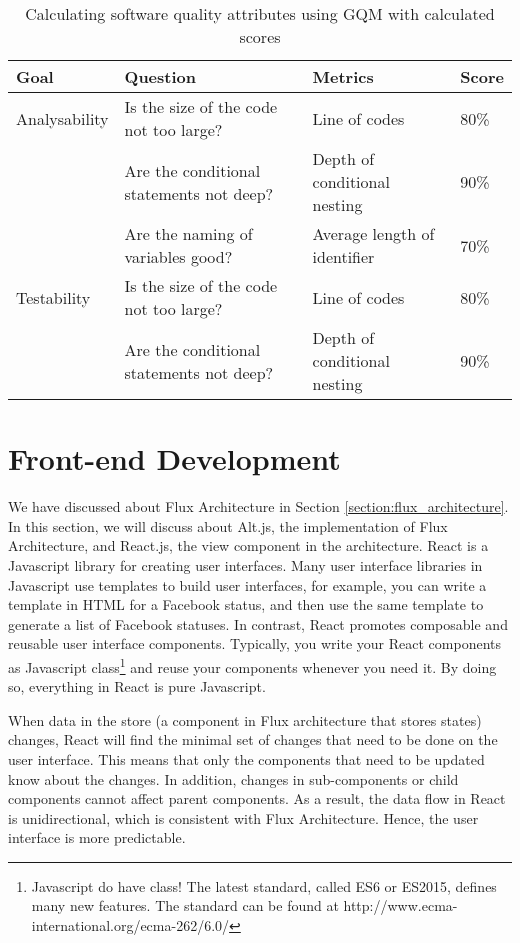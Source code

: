 \begin{table}
\centering
\begin{tabular}{| l | p{5cm}| p{4cm} | l |}
    \hline
    Goal & Question & Metrics & Score \\
    \hline
    Analysability & Is the size of the code not too large? & Line of codes & 80\% \\
    & Are the conditional statements not deep? & Depth of conditional nesting & 90\% \\
    & Are the naming of variables good? & Average length of identifier & 70\% \\
    \hline
    Testability & Is the size of the code not too large? & Line of codes & 80\% \\
    & Are the conditional statements not deep? & Depth of conditional nesting & 90\% \\
    \hline
\end{tabular}
\caption{Calculating software quality attributes using GQM with calculated scores}
\label{table:calculate_gqm}
\end{table}

\section{Front-end Development} \label{section:frontend_development}

We have discussed about Flux Architecture in Section \ref{section:flux_architecture}. In this section, we will discuss about Alt.js, the implementation of Flux Architecture, and React.js, the view component in the architecture. React is a Javascript library for creating user interfaces. Many user interface libraries in Javascript use templates to build user interfaces, for example, you can write a template in HTML for a Facebook status, and then use the same template to generate a list of Facebook statuses. In contrast, React promotes composable and reusable user interface components. Typically, you write your React components as Javascript class\footnote{Javascript do have class! The latest standard, called ES6 or ES2015, defines many new features. The standard can be found at http://www.ecma-international.org/ecma-262/6.0/} and reuse your components whenever you need it. By doing so, everything in React is pure Javascript. 

When data in the store (a component in Flux architecture that stores states) changes, React will find the minimal set of changes that need to be done on the user interface. This means that only the components that need to be updated know about the changes. In addition, changes in sub-components or child components cannot affect parent components. As a result, the data flow in React is unidirectional, which is consistent with Flux Architecture. Hence, the user interface is more predictable. 

